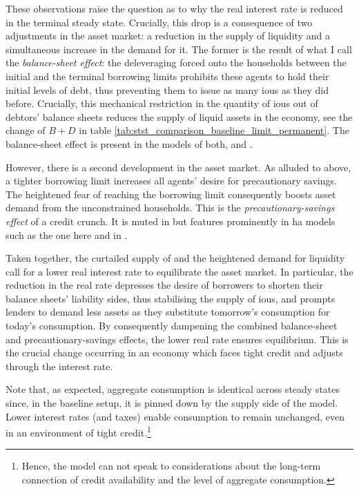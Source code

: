 \documentclass[12pt]{article} %
\numberwithin{equation}{section} %
\numberwithin{figure}{section}
\numberwithin{table}{section}
\begin{document}
These observations raise the question as to why the real interest rate is reduced in the terminal steady state. Crucially, this drop is a consequence of two adjustments in the asset market: a reduction in the supply of liquidity and a simultaneous increase in the demand for it. The former is the result of what I call the \textit{balance-sheet effect}: the deleveraging forced onto the households between the initial and the terminal borrowing limits prohibits these agents to hold their initial levels of debt, thus preventing them to issue as many \Gls{iou}s as they did before. Crucially, this mechanical restriction in the quantity of \Gls{iou}s out of debtors' balance sheets reduces the supply of liquid assets in the economy, see the change of $B + D$ in table \ref{tab:stst_comparison_baseline_limit_permanent}. The balance-sheet effect is present in the models of both, \textcite{egg2012} and \textcite{gl2017}. 

However, there is a second development in the asset market. As alluded to above, a tighter borrowing limit increases all agents' desire for precautionary savings. The heightened fear of reaching the borrowing limit consequently boosts asset demand from the unconstrained households. This is the \textit{precautionary-savings effect} of a credit crunch. It is muted in \textcite{egg2012} but features prominently in \Gls{ha} models such as the one here and in \textcite{gl2017}. 

Taken together, the curtailed supply of and the heightened demand for liquidity call for a lower real interest rate to equilibrate the asset market. In particular, the reduction in the real rate depresses the desire of borrowers to shorten their balance sheets' liability sides, thus stabilising the supply of \Gls{iou}s, and prompts lenders to demand less assets as they substitute tomorrow's consumption for today's consumption. By consequently dampening the combined balance-sheet and precautionary-savings effects, the lower real rate ensures equilibrium. This is the crucial change occurring in an economy which faces tight credit and adjusts through the interest rate.

Note that, as expected, aggregate consumption is identical across steady states since, in the baseline setup, it is pinned down by the supply side of the model. Lower interest rates (and taxes) enable consumption to remain unchanged, even in an environment of tight credit.\footnote{Hence, the model can not speak to considerations about the long-term connection of credit availability and the level of aggregate consumption.}
\end{document}
